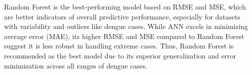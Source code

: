 \documentclass{article}
\begin{document}
Random Forest is the best-performing model based on RMSE and MSE, which are better indicators of overall predictive performance, especially for datasets with variability and outliers like dengue cases.
While ANN excels in minimizing average error (MAE), its higher RMSE and MSE compared to Random Forest suggest it is less robust in handling extreme cases.
Thus, Random Forest is recommended as the best model due to its superior generalization and error minimization across all ranges of dengue cases.

\end{document}

